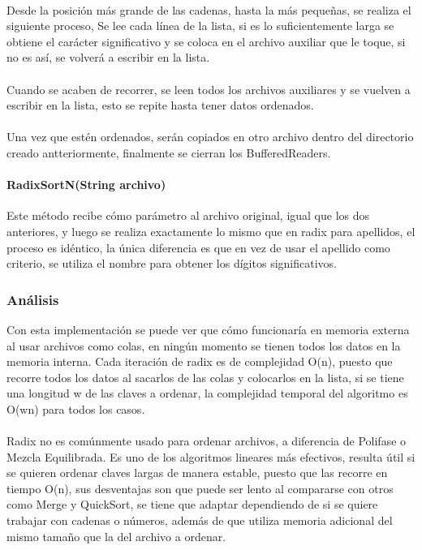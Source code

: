 \documentclass[11pt]{article}
\begin{document}
\paragraph{}
Desde la posición más grande de las cadenas, hasta la más pequeñas, se realiza el siguiente proceso, Se lee cada línea de la lista, si es lo suficientemente larga se obtiene el carácter significativo y se coloca en el archivo auxiliar que le toque, si no es así, se volverá a escribir en la lista. 
\paragraph{}
Cuando se acaben de recorrer, se leen todos los archivos auxiliares y se vuelven a escribir en la lista, esto se repite hasta tener datos ordenados.
\paragraph{} Una vez que estén ordenados, serán copiados en otro archivo dentro del directorio creado antteriormente, finalmente se cierran los BufferedReaders. 

\paragraph{RadixSortN(String archivo)}
Este método recibe cómo parámetro al archivo original, igual que los dos anteriores, y luego se realiza exactamente lo mismo que en radix para apellidos, el proceso es idéntico, la única diferencia es que en vez de usar el apellido como criterio, se utiliza el nombre para obtener los dígitos significativos. 

\subsubsection{Análisis}
Con esta implementación se puede ver que cómo funcionaría en memoria externa al usar archivos como colas, en ningún momento se tienen todos los datos en la memoria interna. Cada iteración de radix es de complejidad O(n), puesto que recorre todos los datos al sacarlos de las colas y colocarlos en la lista, si se tiene una longitud w de las claves a ordenar, la complejidad temporal del algoritmo es O(wn) para todos los casos. 
\paragraph{}
Radix no es comúnmente usado para ordenar archivos, a diferencia de Polifase o Mezcla Equilibrada. Es uno de los algoritmos lineares más efectivos, resulta útil si se quieren ordenar claves largas de manera estable, puesto que las recorre en tiempo O(n), sus desventajas son que puede ser lento al compararse con otros como Merge y QuickSort, se tiene que adaptar dependiendo de si se quiere trabajar con cadenas o números, además de que utiliza memoria adicional del mismo tamaño que la del archivo a ordenar. 
\end{document}
